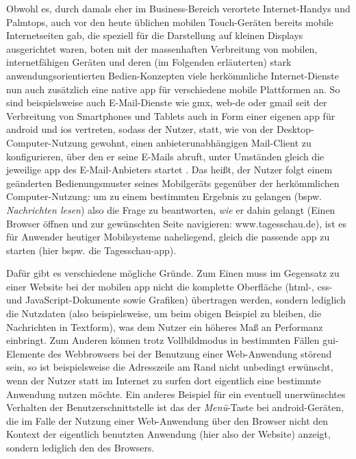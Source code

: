 Obwohl es, durch damals eher im Business-Bereich verortete Internet-Handys und Palmtops, auch vor den heute üblichen mobilen Touch-Geräten bereits mobile Internetseiten gab, die speziell für die Darstellung auf kleinen Displays ausgerichtet waren, boten mit der massenhaften Verbreitung von mobilen, internetfähigen Geräten und deren (im Folgenden erläuterten) stark anwendungsorientierten Bedien-Konzepten viele herkömmliche Internet-Dienste nun auch zusätzlich eine native \gls{app} für verschiedene mobile Plattformen an.
So sind beispielsweise auch E-Mail-Dienste wie \gls{gmx}, \gls{web-de} oder \gls{gmail} seit der Verbreitung von Smartphones und Tablets auch in Form einer eigenen \gls{app} für \gls{android} und \gls{ios} vertreten, sodass der Nutzer, statt, wie von der Desktop-Computer-Nutzung gewohnt, einen anbieterunabhängigen Mail-Client zu konfigurieren, über den er seine E-Mails abruft, unter Umständen gleich die jeweilige \gls{app} des E-Mail-Anbieters startet \cite{gmx, web.de, gmail}.
Das heißt, der Nutzer folgt einem geänderten Bedienungsmuster seines Mobilgeräts gegenüber der herkömmlichen Computer-Nutzung: um zu einem bestimmten Ergebnis zu gelangen (bspw. \emph{Nachrichten lesen}) also die Frage zu beantworten, \emph{wie} er dahin gelangt (Einen Browser öffnen und zur gewünschten Seite navigieren: www.tagesschau.de), ist es für Anwender heutiger Mobilsysteme naheliegend, gleich die passende \gls{app} zu starten (hier bspw. die Tagesschau-\gls{app}).

Dafür gibt es verschiedene mögliche Gründe. Zum Einen muss im Gegensatz zu einer Website bei der mobilen \gls{app} nicht die komplette Oberfläche (\gls{html}-, \gls{css}- und JavaScript-Dokumente sowie Grafiken) übertragen werden, sondern lediglich die Nutzdaten (also beispielsweise, um beim obigen Beispiel zu bleiben, die Nachrichten in Textform), was dem Nutzer ein höheres Maß an Performanz einbringt.
Zum Anderen können trotz Vollbildmodus in bestimmten Fällen \gls{gui}-Elemente des Webbrowsers bei der Benutzung einer Web-Anwendung störend sein, so ist beispielsweise die Adresszeile am Rand nicht unbedingt erwünscht, wenn der Nutzer statt im Internet zu surfen dort eigentlich eine bestimmte Anwendung nutzen möchte. 
Ein anderes Beispiel für ein eventuell unerwünschtes Verhalten der Benutzerschnittstelle ist das der \emph{Menü}-Taste bei \gls{android}-Geräten, die im Falle der Nutzung einer Web-Anwendung über den Browser nicht den Kontext der eigentlich benutzten Anwendung (hier also der Website) anzeigt, sondern lediglich den des Browsers.


